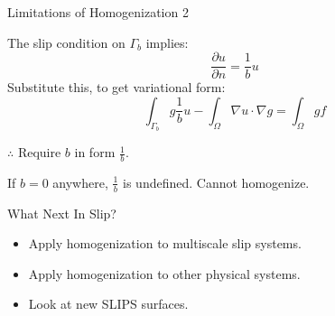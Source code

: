 \documentclass{beamer}
\begin{document}
\begin{frame}{Limitations of Homogenization 2}

The slip condition on $\Gamma_b$ implies:
\begin{equation}
\frac{\partial u}{\partial n} = \frac{1}{b}u
\end{equation}
Substitute this, to get variational form:
\begin{equation}
\int_{\Gamma_b} g \frac{1}{b} u 
 - \int_{\Omega} \nabla u \cdot \nabla g  
= \int_{\Omega} g f
\end{equation}


$\therefore$ Require $b$ in form $\displaystyle \frac{1}{b}$.

\vspace{1em}
If $b=0$ anywhere, $\frac{1}{b}$ is undefined. \phantom{word}Cannot homogenize.

\end{frame}




\begin{frame}{What Next In Slip?}
\begin{itemize}
\item Apply homogenization to multiscale slip systems.
\item Apply homogenization to other physical systems.
\item Look at new SLIPS surfaces.
\end{itemize}

\end{frame}
\end{document}
